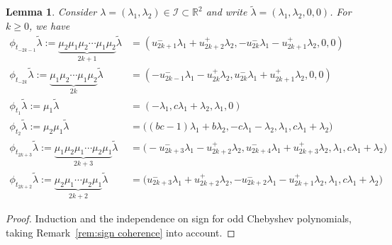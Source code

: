 \documentclass{amsart}
\newtheorem{lemma}[theorem]{Lemma}
\numberwithin{theorem}{section}
\newcommand{\cI}{\mathcal{I}}
\newcommand{\RR}{\mathbb{R}}
\begin{document}
  \begin{lemma}
    Consider $\lambda=(\lambda_1,\lambda_2)\in\cI\subset\RR^2$ and write $\tilde\lambda=(\lambda_1,\lambda_2,0,0)$.
    For $k\ge0$, we have
    \begin{align*}
      \phi_{t_{-2k-1}}\tilde\lambda:=\underbrace{\mu_2\mu_1\mu_2\cdots\mu_1\mu_2}_{2k+1}\tilde\lambda
      &= 
      (u^-_{2k+1}\lambda_1+u^+_{2k+2}\lambda_2,-u^-_{2k}\lambda_1-u^+_{2k+1}\lambda_2,0,0)
      \\
      \phi_{t_{-2k}}\tilde\lambda:=\underbrace{\mu_1\mu_2\cdots\mu_1\mu_2}_{2k}\tilde\lambda
      &= 
      (-u^-_{2k-1}\lambda_1-u^+_{2k}\lambda_2,u^-_{2k}\lambda_1+u^+_{2k+1}\lambda_2,0,0)
      \\
      \phi_{t_1}\tilde\lambda:=\mu_1\tilde\lambda
      &= 
      (-\lambda_1,c\lambda_1+\lambda_2,\lambda_1,0)
      \\
      \phi_{t_2}\tilde\lambda:=\mu_2\mu_1\tilde\lambda
      &= 
      \big((bc-1)\lambda_1+b\lambda_2,-c\lambda_1-\lambda_2,\lambda_1,c\lambda_1+\lambda_2\big)
      \\
      \phi_{t_{2k+3}}\tilde\lambda:=\underbrace{\mu_1\mu_2\mu_1\cdots\mu_2\mu_1}_{2k+3}\tilde\lambda
      &= 
      \big(-u^-_{2k+3}\lambda_1-u^+_{2k+2}\lambda_2,u^-_{2k+4}\lambda_1+u^+_{2k+3}\lambda_2,\lambda_1,c\lambda_1+\lambda_2\big)
      \\
      \phi_{t_{2k+2}}\tilde\lambda:=\underbrace{\mu_2\mu_1\cdots\mu_2\mu_1}_{2k+2}\tilde\lambda 
      &= 
      \big(u^-_{2k+3}\lambda_1+u^+_{2k+2}\lambda_2,-u^-_{2k+2}\lambda_1-u^+_{2k+1}\lambda_2,\lambda_1,c\lambda_1+\lambda_2\big)
    \end{align*}
  \end{lemma}
  \begin{proof}
    Induction and the independence on sign for odd Chebyshev polynomials, taking Remark~\ref{rem:sign coherence} into account.
  \end{proof}
\end{document}
